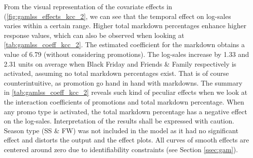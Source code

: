 









From the visual representation of the covariate effects in (\autoref{fig:gamlss_effects_kcc_2}, we can see that the temporal effect on log-sales varies within a certain range.
Higher total markdown percentages enhance higher response values, which can also be observed when looking at \autoref{tab:gamlss_coeff_kcc_2}. The estimated coefficient for the markdown obtains a value of 6.79 (without considering promotions). The log-sales increase by 1.33 and 2.31 units on average when Black Friday and Friends \& Family respectively is activated, assuming no total markdown percentages exist. That is of course counterintuitive, as promotion go hand in hand with markdowns. The summary in \autoref{tab:gamlss_coeff_kcc_2} reveals such kind of peculiar effects when we look at the interaction coefficients of promotions and total markdown percentage. When any promo type is activated, the total markdown percentage has a negative effect on the log-sales. Interpretation of the results shall be expressed with caution. Season type (SS \& FW) was not included in the model as it had no significant effect and distorts the output and the effect plots. All curves of smooth effects are centered around zero due to identifiability constraints (see Section \ref{ssec:gam}).
\\



